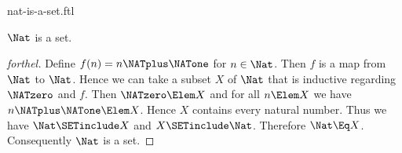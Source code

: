 \documentclass{stex}
\begin{document}
\begin{smodule}{nat-is-a-set.ftl}

\begin{proposition}[forthel]
  $\Nat$ is a set.
\end{proposition}
\begin{proof}[forthel]
  Define $f(n) = n \NATplus \NATone$ for $n \in \Nat$.
  Then $f$ is a map from $\Nat$ to $\Nat$.
  Hence we can take a subset $X$ of $\Nat$ that is inductive regarding
  $\NATzero$ and $f$.
  Then $\NATzero \Elem X$ and for all $n \Elem X$ we have $n \NATplus \NATone \Elem X$.
  Hence $X$ contains every natural number.
  Thus we have $\Nat \SETinclude X$ and $X \SETinclude \Nat$.
  Therefore $\Nat \Eq X$.
  Consequently $\Nat$ is a set.
\end{proof}
\end{smodule}
\end{document}
